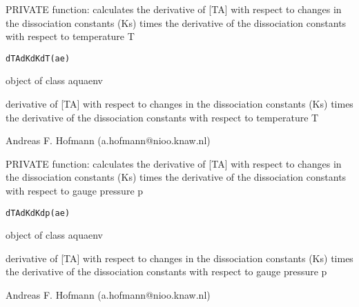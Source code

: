 \documentclass{article}
\begin{document}
\begin{Description}\relax
PRIVATE function: calculates the derivative of [TA] with respect to changes in the dissociation constants (Ks) times the derivative of the dissociation constants with respect to temperature T
\end{Description}
\begin{Usage}
\begin{verbatim}dTAdKdKdT(ae)\end{verbatim}
\end{Usage}
\begin{Arguments}
\begin{ldescription}
\item[\code{ae }] object of class aquaenv
\end{ldescription}
\end{Arguments}
\begin{Value}
derivative of [TA] with respect to changes in the dissociation constants (Ks) times the derivative of the dissociation constants with respect to temperature T
\end{Value}
\begin{Author}\relax
Andreas F. Hofmann (a.hofmann@nioo.knaw.nl)
\end{Author}

\begin{Description}\relax
PRIVATE function: calculates the derivative of [TA] with respect to changes in the dissociation constants (Ks) times the derivative of the dissociation constants with respect to gauge pressure p
\end{Description}
\begin{Usage}
\begin{verbatim}dTAdKdKdp(ae)\end{verbatim}
\end{Usage}
\begin{Arguments}
\begin{ldescription}
\item[\code{ae }] object of class aquaenv
\end{ldescription}
\end{Arguments}
\begin{Value}
derivative of [TA] with respect to changes in the dissociation constants (Ks) times the derivative of the dissociation constants with respect to gauge pressure p 
\end{Value}
\begin{Author}\relax
Andreas F. Hofmann (a.hofmann@nioo.knaw.nl)
\end{Author}
\end{document}
